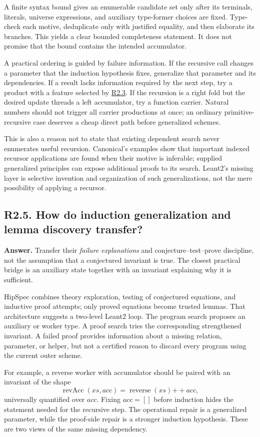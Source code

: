 \documentclass[11pt,a4paper]{article}
\newcommand{\question}[2]{\subsection{#1. #2}\label{q:#1}}
\newcommand{\qref}[1]{\hyperref[q:#1]{#1}}
\theoremstyle{definition}
\theoremstyle{remark}
\begin{document}
A finite syntax bound gives an enumerable candidate set only after its terminals, literals, universe expressions, and auxiliary type-former choices are fixed. Type-check each motive, deduplicate only with justified equality, and then elaborate its branches. This yields a clear bounded completeness statement. It does not promise that the bound contains the intended accumulator.

A practical ordering is guided by failure information. If the recursive call changes a parameter that the induction hypothesis fixes, generalize that parameter and its dependencies. If a result lacks information required by the next step, try a product with a feature selected by \qref{R2.3}. If the recursion is a right fold but the desired update threads a left accumulator, try a function carrier. Natural numbers should not trigger all carrier productions at once; an ordinary primitive-recursive case deserves a cheap direct path before generalized schemes.

This is also a reason not to state that existing dependent search never enumerates useful recursion. Canonical's examples show that important indexed recursor applications are found when their motive is inferable; supplied generalized principles can expose additional proofs to its search.\cite{canonical} Leant2's missing layer is selective invention and organization of such generalizations, not the mere possibility of applying a recursor.

\question{R2.5}{How do induction generalization and lemma discovery transfer?}

\textbf{Answer.} Transfer their \emph{failure explanations} and conjecture--test--prove discipline, not the assumption that a conjectured invariant is true. The closest practical bridge is an auxiliary state together with an invariant explaining why it is sufficient.

HipSpec combines theory exploration, testing of conjectured equations, and inductive proof attempts; only proved equations become trusted lemmas.\cite{hipspec} That architecture suggests a two-level Leant2 loop. The program search proposes an auxiliary or worker type. A proof search tries the corresponding strengthened invariant. A failed proof provides information about a missing relation, parameter, or helper, but not a certified reason to discard every program using the current outer scheme.

For example, a reverse worker with accumulator should be paired with an invariant of the shape
\[
 \operatorname{revAcc}(xs,acc)
   =\operatorname{reverse}(xs)\mathbin{+\!+}acc,
\]
universally quantified over $acc$. Fixing $acc=[]$ before induction hides the statement needed for the recursive step. The operational repair is a generalized parameter, while the proof-side repair is a stronger induction hypothesis. These are two views of the same missing dependency.
\end{document}
